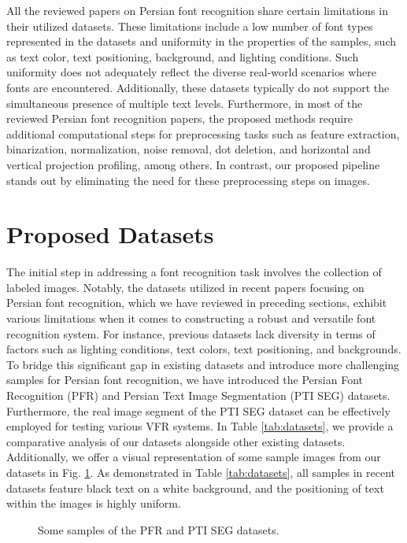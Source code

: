 \documentclass[conference]{IEEEtran}
\begin{document}
All the reviewed papers on Persian font recognition share certain limitations in their utilized datasets. These limitations include a low number of font types represented in the datasets and uniformity in the properties of the samples, such as text color, text positioning, background, and lighting conditions. Such uniformity does not adequately reflect the diverse real-world scenarios where fonts are encountered. Additionally, these datasets typically do not support the simultaneous presence of multiple text levels.
Furthermore, in most of the reviewed Persian font recognition papers, the proposed methods require additional computational steps for preprocessing tasks such as feature extraction, binarization, normalization, noise removal, dot deletion, and horizontal and vertical projection profiling, among others.
In contrast, our proposed pipeline stands out by eliminating the need for these preprocessing steps on images. \section{Proposed Datasets}
The initial step in addressing a font recognition task involves the collection of labeled images. Notably, the datasets utilized in recent papers focusing on Persian font recognition, which we have reviewed in preceding sections, exhibit various limitations when it comes to constructing a robust and versatile font recognition system. For instance, previous datasets lack diversity in terms of factors such as lighting conditions, text colors, text positioning, and backgrounds.
To bridge this significant gap in existing datasets and introduce more challenging samples for Persian font recognition, we have introduced the Persian Font Recognition (PFR) and Persian Text Image Segmentation (PTI SEG) datasets. Furthermore, the real image segment of the PTI SEG dataset can be effectively employed for testing various VFR systems.
In Table \ref{tab:datasets}, we provide a comparative analysis of our datasets alongside other existing datasets. Additionally, we offer a visual representation of some sample images from our datasets in Fig. \ref{fig:samples}.
As demonstrated in Table \ref{tab:datasets}, all samples in recent datasets feature black text on a white background, and the positioning of text within the images is highly uniform.

\begin{figure}[h] 
\caption{Some samples of the PFR and PTI SEG datasets.}
\label{fig:samples}
\end{figure}  
\end{document}
